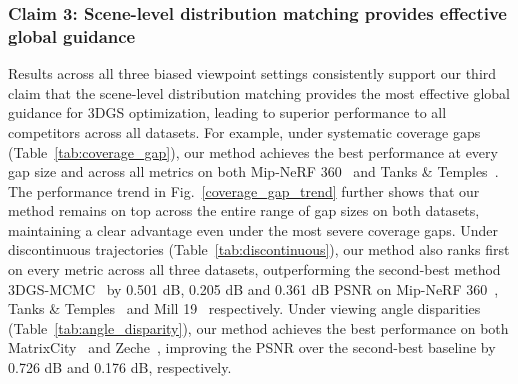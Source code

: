 \documentclass[lettersize,journal]{IEEEtran}
\begin{document}
\subsubsection{Claim 3: Scene-level distribution matching provides effective global guidance} 

Results across all three biased viewpoint settings consistently support our third claim that the scene-level distribution matching provides the most effective global guidance for 3DGS optimization, leading to superior performance to all competitors across all datasets. 
For example, 
under systematic coverage gaps
(Table~\ref{tab:coverage_gap}), our method achieves the best performance at every gap size and across all metrics on both Mip-NeRF 360~\cite{mipnerf360} and Tanks \& Temples~\cite{tankstemples}.
The performance trend in Fig.~\ref{coverage_gap_trend} further shows that our method remains on top across the entire range of gap sizes on both datasets, maintaining a clear advantage even under the most severe coverage gaps.
Under discontinuous trajectories 
(Table~\ref{tab:discontinuous}), our method also ranks first on every metric across all three datasets, outperforming the second-best method 3DGS-MCMC~\cite{mcmc} by 0.501 dB, 0.205 dB and 0.361 dB PSNR on Mip-NeRF 360~\cite{mipnerf360}, Tanks \& Temples~\cite{tankstemples} and Mill 19~\cite{meganerf} respectively.
Under viewing angle disparities
(Table~\ref{tab:angle_disparity}), our method achieves the best performance on both MatrixCity~\cite{matrixcity} and Zeche~\cite{isprs}, improving the PSNR over the second-best baseline by 0.726 dB and 0.176 dB, respectively.
\end{document}
